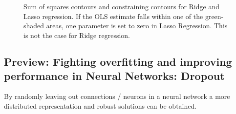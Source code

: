 \begin{figure}[!htb]
    \centering
    
    \caption{Sum of squares contours and constraining contours for Ridge and Lasso regression. If the OLS estimate falls within one of
    the green-shaded areas, one parameter is set to zero in Lasso Regression. This is not the case for Ridge regression.}
    \label{fig:ridge_lasso_constraint}
\end{figure}

\subsection{Preview: Fighting overfitting and improving performance in Neural Networks: Dropout}
By randomly leaving out connections / neurons in a neural network a more distributed representation
and robust solutions can be obtained.

\pagebreak